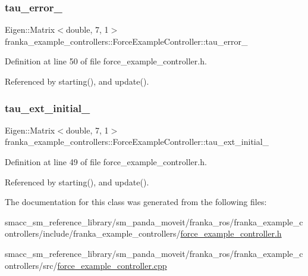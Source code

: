 \subsubsection{\texorpdfstring{tau\+\_\+error\+\_\+}{tau\_error\_}}
{\footnotesize\ttfamily Eigen\+::\+Matrix$<$double, 7, 1$>$ franka\+\_\+example\+\_\+controllers\+::\+Force\+Example\+Controller\+::tau\+\_\+error\+\_\+\hspace{0.3cm}{\ttfamily [private]}}



Definition at line 50 of file force\+\_\+example\+\_\+controller.\+h.



Referenced by starting(), and update().

\mbox{\label{classfranka__example__controllers_1_1ForceExampleController_a5de4c22bd3d9d27f039f33f0c10fa11f}} 
\subsubsection{\texorpdfstring{tau\+\_\+ext\+\_\+initial\+\_\+}{tau\_ext\_initial\_}}
{\footnotesize\ttfamily Eigen\+::\+Matrix$<$double, 7, 1$>$ franka\+\_\+example\+\_\+controllers\+::\+Force\+Example\+Controller\+::tau\+\_\+ext\+\_\+initial\+\_\+\hspace{0.3cm}{\ttfamily [private]}}



Definition at line 49 of file force\+\_\+example\+\_\+controller.\+h.



Referenced by starting(), and update().



The documentation for this class was generated from the following files\+:\begin{DoxyCompactItemize}
\item 
smacc\+\_\+sm\+\_\+reference\+\_\+library/sm\+\_\+panda\+\_\+moveit/franka\+\_\+ros/franka\+\_\+example\+\_\+controllers/include/franka\+\_\+example\+\_\+controllers/\hyperlink{force__example__controller_8h}{force\+\_\+example\+\_\+controller.\+h}\item 
smacc\+\_\+sm\+\_\+reference\+\_\+library/sm\+\_\+panda\+\_\+moveit/franka\+\_\+ros/franka\+\_\+example\+\_\+controllers/src/\hyperlink{force__example__controller_8cpp}{force\+\_\+example\+\_\+controller.\+cpp}\end{DoxyCompactItemize}
